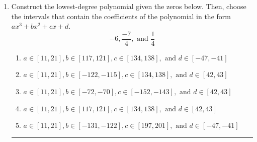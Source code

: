 \documentclass[14pt]{extbook}
\newcommand{\litem}[1]{\item#1\hspace*{-1cm}\rule{\textwidth}{0.4pt}}
\begin{document}
\begin{enumerate}
{\begin{enumerate}[label=\Alph*.]
\end{enumerate} }
\litem{
Construct the lowest-degree polynomial given the zeros below. Then, choose the intervals that contain the coefficients of the polynomial in the form $ax^3+bx^2+cx+d$.\[ -6, \frac{-7}{4}, \text{ and } \frac{1}{4} \]\begin{enumerate}[label=\Alph*.]
\item \( a \in [11, 21], b \in [117, 121], c \in [134, 138], \text{ and } d \in [-47, -41] \)
\item \( a \in [11, 21], b \in [-122, -115], c \in [134, 138], \text{ and } d \in [42, 43] \)
\item \( a \in [11, 21], b \in [-72, -70], c \in [-152, -143], \text{ and } d \in [42, 43] \)
\item \( a \in [11, 21], b \in [117, 121], c \in [134, 138], \text{ and } d \in [42, 43] \)
\item \( a \in [11, 21], b \in [-131, -122], c \in [197, 201], \text{ and } d \in [-47, -41] \)


\end{enumerate}}
\end{enumerate}
\end{document}
